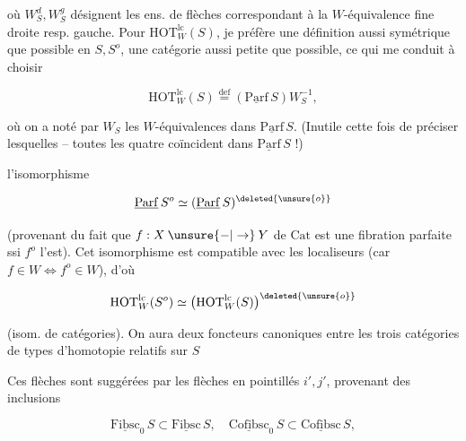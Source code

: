où $W^d_S,W^g_S$ désignent les ens. de flèches correspondant à la $W$-équivalence fine droite resp. gauche. Pour $\mathrm{HOT}^{\mathrm{lc}}_W(S)$, je préfère une définition aussi symétrique que possible en $S,S^o$,    une catégorie aussi petite que possible, ce qui me conduit à choisir

\[
 \mathrm{HOT}^{\mathrm{lc}}_W(S)\overset{\mathrm{def}}{=}(\underline{\mathrm{Parf}}\,S)W_S^{-1},
\]

où on a noté par $W_S$ les $W$-équivalences dans $\underline{\mathrm{Parf}}\,S$. (Inutile cette fois de préciser lesquelles -- toutes les quatre coïncident dans $\underline{\mathrm{Parf}}\,S$ !)

 l'isomorphisme

\[
 \underline{\mathrm{Parf}}\,S^o\simeq(\underline{\mathrm{Parf}}\,S)^{\deleted{\unsure{o}}}
\]

(provenant du fait que $f:X\mathbin{\unsure{-|\to}}Y$ de $\mathrm{Cat}$ est une fibration parfaite ssi $f^o$ l'est). Cet isomorphisme  est compatible avec les localiseurs (car $f\in W\Longleftrightarrow f^o\in W$), d'où

\[
 \mathrm{HOT}^{\mathrm{lc}}_W(S^o)\simeq\bigl(\mathrm{HOT}^{\mathrm{lc}}_W(S)\bigr)^{\deleted{\unsure{o}}}
\]

(isom. de catégories). On aura deux foncteurs canoniques entre les trois catégories de types d'homotopie relatifs sur $S$


Ces flèches  sont suggérées par les flèches en pointillés $i',j'$, provenant des inclusions

\[
 \underline{\mathrm{Fibsc}}_0\,S\subset\underline{\mathrm{Fibsc}}\,S,\quad
 \underline{\mathrm{Cofibsc}}_0\,S\subset\underline{\mathrm{Cofibsc}}\,S,
\]

